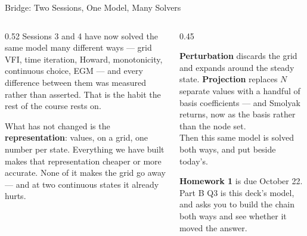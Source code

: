 \begin{frame}{Bridge: Two Sessions, One Model, Many Solvers}
\begin{columns}[T]
\begin{column}{0.52\textwidth}
\small
Sessions 3 and 4 have now solved the same model many different ways --- grid VFI, time iteration, Howard, monotonicity, continuous choice, EGM --- and every difference between them was measured rather than asserted. That is the habit the rest of the course rests on.
\medskip

What has not changed is the \textbf{representation}: values, on a grid, one number per state. Everything we have built makes that representation cheaper or more accurate. None of it makes the grid go away --- and at two continuous states it already hurts.
\end{column}
\begin{column}{0.45\textwidth}
\begin{conceptbox}[title=\textbf{Next week (S5)}]\small
\textbf{Perturbation} discards the grid and expands around the steady state. \textbf{Projection} replaces $N$ separate values with a handful of basis coefficients --- and Smolyak returns, now as the basis rather than the node set.\\[1mm]
Then this same model is solved both ways, and put beside today's.
\end{conceptbox}
\medskip
\begin{examplebox}\footnotesize
\textbf{Homework 1} is due October 22. Part B Q3 is this deck's model, and asks you to build the chain both ways and see whether it moved the answer.
\end{examplebox}
\end{column}
\end{columns}
\end{frame}


